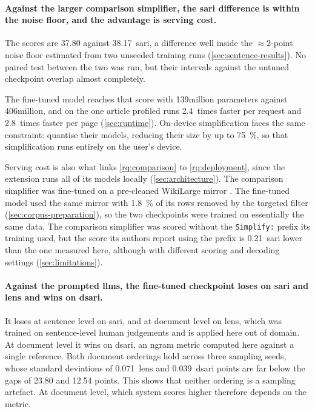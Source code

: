 \paragraph{Against the larger comparison simplifier, the \gls{sari} difference is within the noise floor, and the advantage is serving cost.}
The scores are \num{37.80} against \num{38.17}~\gls{sari}, a difference well inside the \({\approx}2\)-point noise floor estimated from two unseeded training runs (\cref{sec:sentence-results}).
No paired test between the two was run, but their intervals against the untuned checkpoint overlap almost completely.

The fine-tuned model reaches that score with 139\gls{million} parameters against 406\gls{million}, and on the one article profiled runs \num{2.4}~times faster per request and \num{2.8}~times faster per page (\cref{sec:runtime}).
On-device simplification faces the same constraint: \textcite[105]{romero-etal-2025-efficient} quantise their models, reducing their size by up to \qty{75}{\percent}, so that simplification runs entirely on the user's device.

Serving cost is also what links \cref{rq:comparison} to \cref{rq:deployment}, since the extension runs all of its models locally (\cref{sec:architecture}).
The comparison simplifier was fine-tuned on a pre-cleaned WikiLarge mirror \parencite[3]{cohen2026simplify}.
The fine-tuned model used the same mirror with \qty{1.8}{\percent} of its rows removed by the targeted filter (\cref{sec:corpus-preparation}), so the two checkpoints were trained on essentially the same data.
The comparison simplifier was scored without the \texttt{Simplify:} prefix its training used, but the score its authors report using the prefix is \num{0.21}~\gls{sari} lower than the one measured here, although with different scoring and decoding settings (\cref{sec:limitations}).

\paragraph{Against the prompted \glspl{llm}, the fine-tuned checkpoint loses on \gls{sari} and \gls{lens} and wins on \gls{dsari}.}
It loses at sentence level on \gls{sari}, and at document level on \gls{lens}, which was trained on sentence-level human judgements \parencite[16385--16386]{maddela-etal-2023-lens} and is applied here out of domain.
At document level it wins on \gls{dsari}, an \gls{ngram} metric \parencite[8002]{sun-etal-2021-document} computed here against a single reference.
Both document orderings hold across three sampling seeds, whose standard deviations of \num{0.071}~\gls{lens} and \num{0.039}~\gls{dsari} points are far below the gaps of \num{23.80} and \num{12.54} points.
This shows that neither ordering is a sampling artefact.
At document level, which system scores higher therefore depends on the metric.

